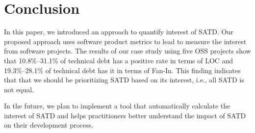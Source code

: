 \documentclass[10pt, conference]{IEEEtran}
\begin{document}
\section{Conclusion} \label{sec:conclusion}
In this paper, we introduced an approach to quantify interest of SATD. Our proposed approach uses software product metrics to lead to measure the interest from software projects.
The results of our case study using five OSS projects show that 10.8\%--31.1\% of technical debt has a positive rate in terms of LOC and 19.3\%--28.1\% of technical debt has it in terms of Fan-In. This finding indicates that that we should be prioritizing SATD based on its interest, i.e., all SATD is not equal.

In the future, we plan to implement a tool that automatically calculate 
the interest of SATD and helps practitioners better understand the impact of SATD on their development process.

\balance



\end{document}
